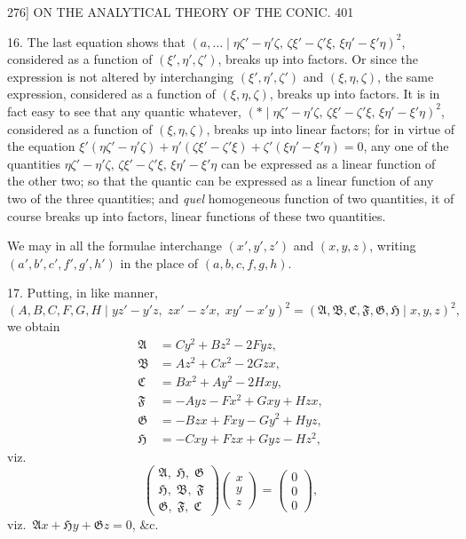 \documentclass[11pt]{article}
\begin{document}
\begin{center}
\textsc{276]} \hfill ON THE ANALYTICAL THEORY OF THE CONIC. \hfill 401
\end{center}

\textsc{16.} The last equation shows that $(a,\dots \mid \eta\zeta'-\eta'\zeta,\,\zeta\xi'-\zeta'\xi,\,\xi\eta'-\xi'\eta)^{2}$, considered
as a function of $(\xi',\eta',\zeta')$, breaks up into factors. Or since the expression is not
altered by interchanging $(\xi',\eta',\zeta')$ and $(\xi,\eta,\zeta)$, the same expression, considered as a
function of $(\xi,\eta,\zeta)$, breaks up into factors. It is in fact easy to see that any quantic
whatever, $(*\mid \eta\zeta'-\eta'\zeta,\,\zeta\xi'-\zeta'\xi,\,\xi\eta'-\xi'\eta)^{2}$, considered as a function of $(\xi,\eta,\zeta)$, breaks up
into linear factors; for in virtue of the equation $\xi'(\eta\zeta'-\eta'\zeta)+\eta'(\zeta\xi'-\zeta'\xi)+\zeta'(\xi\eta'-\xi'\eta)=0$,
any one of the quantities $\eta\zeta'-\eta'\zeta,\,\zeta\xi'-\zeta'\xi,\,\xi\eta'-\xi'\eta$ can be expressed as a linear
function of the other two; so that the quantic can be expressed as a linear function of
any two of the three quantities; and \emph{quel} homogeneous function of two quantities, it
of course breaks up into factors, linear functions of these two quantities.

We may in all the formulae interchange $(x',y',z')$ and $(x,y,z)$, writing $(a',b',c',f',g',h')$
in the place of $(a,b,c,f,g,h)$.

\textsc{17.} Putting, in like manner,
\[ (A,B,C,F,G,H \mid yz'-y'z,\;zx'-z'x,\;xy'-x'y)^{2}=(\mathfrak{A},\mathfrak{B},\mathfrak{C},\mathfrak{F},\mathfrak{G},\mathfrak{H} \mid x,y,z)^{2}, \]
we obtain
\begin{align*}
\mathfrak{A} &= Cy^{2}+Bz^{2}-2Fyz,\\
\mathfrak{B} &= Az^{2}+Cx^{2}-2Gzx,\\
\mathfrak{C} &= Bx^{2}+Ay^{2}-2Hxy,\\
\mathfrak{F} &= -Ayz-Fx^{2}+Gxy+Hzx,\\
\mathfrak{G} &= -Bzx+Fxy-Gy^{2}+Hyz,\\
\mathfrak{H} &= -Cxy+Fzx+Gyz-Hz^{2},
\end{align*}
viz.
\[
\begin{pmatrix}\mathfrak{A},\;\mathfrak{H},\;\mathfrak{G}\\ \mathfrak{H},\;\mathfrak{B},\;\mathfrak{F}\\ \mathfrak{G},\;\mathfrak{F},\;\mathfrak{C}\end{pmatrix}
\begin{pmatrix}x\\ y\\ z\end{pmatrix}=
\begin{pmatrix}0\\0\\0\end{pmatrix},
\]
viz.\ $\mathfrak{A}x+\mathfrak{H}y+\mathfrak{G}z=0$, \&c.
\end{document}
